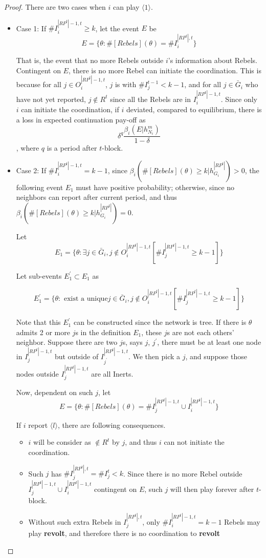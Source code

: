 \documentclass[12pt,letter]{article}
\theoremstyle{definition}
\theoremstyle{remark}
\theoremstyle{claim}
\begin{document}
\begin{proof}

There are two cases when $i$ can play $\langle 1 \rangle$.
\begin{itemize}

\item Case 1: If $\#I^{|RP^t|-1,t}_i\geq k$, let the event $E$ be
\[E=\{\theta: \#[Rebels](\theta)=\# I^{|RP^t|,t}_i\}\]

That is, the event that no more Rebels outside $i$'s information about Rebels. Contingent on $E$, there is no more Rebel can initiate the coordination. This is because for all $j\in O^{|RP^t|-1,t}_i$, $j$ is with $\# I^{t-1}_j< k-1$, and for all $j\in \bar{G}_i$ who have not yet reported, $j\not\in R^t$ since all the Rebels are in $I^{|RP^t|-1,t}_i$. Since only $i$ can initiate the coordination, if $i$ deviated, compared to equilibrium, there is a loss in expected continuation pay-off as
\[\delta^q\frac{\beta_{i}(E|h^{m}_{N_i})}{1-\delta}\], where $q$ is a period after $t$-block.

\item Case 2: If $\#I^{|RP^t|-1,t}_i= k-1$, since $\beta_{i}(\#[Rebels](\theta)\geq k|h^{|RP^t|}_{G_i})>0$, the following event $E_1$ must have positive probability; otherwise, since no neighbors can report after current period, and thus $\beta_{i}(\#[Rebels](\theta)\geq k|h^{|RP^t|}_{G_i})=0$.

Let
\[E_1=\{\theta: \exists j\in \bar{G}_i, j\notin O^{|RP^t|-1,t}_i [\#I^{|RP^t|-1,t}_j\geq k-1]\}\]


Let sub-events $E^{'}_1\subset E_1$ as

\[E^{'}_1=\{\theta: \text{ exist a unique} j\in \bar{G}_i, j\notin O^{|RP^t|-1,t}_i [\#I^{|RP^t|-1,t}_j\geq k-1]\}\] 

Note that this $E^{'}_1$ can be constructed since the network is tree. If there is $\theta$ admits 2 or more $j$s in the definition $E_1$, these $j$s are not each others' neighbor. Suppose there are two $j$s, says $j$, $j^{'}$, there must be at least one node in $I^{|RP^t|-1,t}_j$ but outside of $I^{|RP^t|-1,t}_{j^{'}}$. We then pick a $j$, and suppose those nodes outside $I^{|RP^t|-1,t}_j$ are all Inerts.

Now, dependent on such $j$, let
\[E=\{\theta:\#[Rebels](\theta)=\#I^{|RP^t|-1,t}_j\cup I^{|RP^t|-1,t}_i\}\]

If $i$ report $\langle l \rangle$, there are following consequences.

\begin{itemize}
\item $i$ will be consider as $\notin R^t$ by $j$, and thus $i$ can not initiate the coordination.
\item Such $j$ has $\#I^{|RP^t|,t}_j=\#I^t_j<k$. Since there is no more Rebel outside $I^{|RP^t|-1,t}_j\cup I^{|RP^t|-1,t}_i$ contingent on $E$, such $j$ will then play  forever after $t$-block.
\item Without such extra Rebels in $I^{|RP^t|,t}_j$, only $\#I^{|RP^t|-1,t}_i= k-1$ Rebels may play \textbf{revolt}, and therefore there is no coordination to \textbf{revolt}
\end{itemize}


\end{itemize}
\end{proof}
\end{document}

